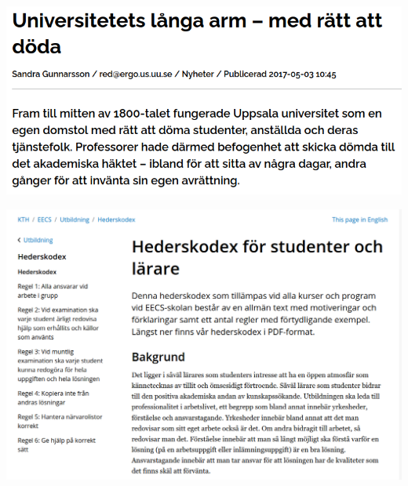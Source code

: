\begin{frame}
  \includegraphics[width=\columnwidth]{fig/uu-domstol.png}
\end{frame}

\begin{frame}
  \includegraphics[width=\columnwidth]{fig/hederskodex.png}
\end{frame}
